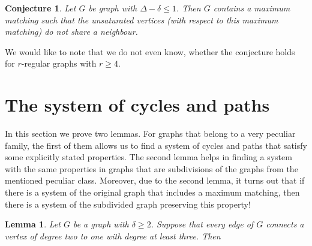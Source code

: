 \documentclass[fleqn,12pt,twoside]{article}
\newtheorem{conjecture}{Conjecture}
\newtheorem{lemma}{Lemma}
\begin{document}
\begin{conjecture}
Let $G$ be graph with $\Delta-\delta\leq 1$. Then $G$ contains a
maximum matching such that the unsaturated vertices (with respect to
this maximum matching) do not share a neighbour.
\end{conjecture}

We would like to note that we do not even know, whether the
conjecture holds for $r$-regular graphs with $r\geq 4$.

\section{The system of cycles and paths}

In this section we prove two lemmas. For graphs that belong to a
very peculiar family, the first of them allows us to find a system
of cycles and paths that satisfy some explicitly stated properties.
The second lemma helps in finding a system with the same properties
in graphs that are subdivisions of the graphs from the mentioned
peculiar class. Moreover, due to the second lemma, it turns out that
if there is a system of the original graph that includes a maximum
matching, then there is a system of the subdivided graph preserving
this property!

\begin{lemma}
\label{Bipartite 2->=3}Let $G$ be a graph with $\delta \geq 2$.
Suppose that every edge of $G$ connects a vertex of degree two to
one with degree at least three. Then
\end{lemma}
\end{document}
